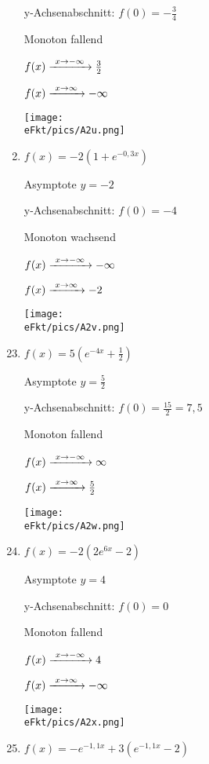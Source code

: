 \begin{Answer}[ref=eFktA2]
\begin{minipage}{\textwidth}
\begin{minipage}{0.5\textwidth}
\begin{enumerate}[label=\alph*)]
				y-Achsenabschnitt: \(f(0)=-\frac{3}{4}\)

				Monoton fallend

				\(f(x)\xrightarrow{\hphantom{\ }x\to-\infty\hphantom{\ }}\frac{3}{2}\)

				\(f(x)\xrightarrow{\hphantom{\ }x\to\infty\hphantom{\ }}-\infty\)

				\texttt{[image: \\eFkt/pics/A2u.png]}
				\item \(f(x)=-2\left(1+e^{-0,3x}\right) \)

				Asymptote \(y=-2\)

				y-Achsenabschnitt: \(f(0)=-4\)

				Monoton wachsend

				\(f(x)\xrightarrow{\hphantom{\ }x\to-\infty\hphantom{\ }}-\infty\)

				\(f(x)\xrightarrow{\hphantom{\ }x\to\infty\hphantom{\ }}-2\)

				\texttt{[image: \\eFkt/pics/A2v.png]}
			\end{enumerate}
		\end{minipage}%
		\begin{minipage}{0.5\textwidth}
			\begin{enumerate}[label=\alph*)]
				\setcounter{enumi}{22}
				\item \(f(x)=5\left(e^{-4x}+\frac{1}{2}\right) \)

				Asymptote \(y=\frac{5}{2}\)

				y-Achsenabschnitt: \(f(0)=\frac{15}{2}=7,5\)

				Monoton fallend

				\(f(x)\xrightarrow{\hphantom{\ }x\to-\infty\hphantom{\ }}\infty\)

				\(f(x)\xrightarrow{\hphantom{\ }x\to\infty\hphantom{\ }}\frac{5}{2}\)

				\texttt{[image: \\eFkt/pics/A2w.png]}
				\item \(f(x)=-2\left( 2e^{6x}-2\right) \)

				Asymptote \(y=4\)

				y-Achsenabschnitt: \(f(0)=0\)

				Monoton fallend

				\(f(x)\xrightarrow{\hphantom{\ }x\to-\infty\hphantom{\ }}4\)

				\(f(x)\xrightarrow{\hphantom{\ }x\to\infty\hphantom{\ }}-\infty\)

				\texttt{[image: \\eFkt/pics/A2x.png]}
			\end{enumerate}
		\end{minipage}%
	\end{minipage}
	\newpage
	\begin{minipage}{\textwidth}
		\begin{minipage}{0.5\textwidth}
			\begin{enumerate}[label=\alph*)]
				\setcounter{enumi}{24}
				\item \(f(x)=-e^{-1,1x}+3\left(e^{-1,1x}-2\right)\)


\end{enumerate}
\end{minipage}
\end{minipage}
\end{Answer}
